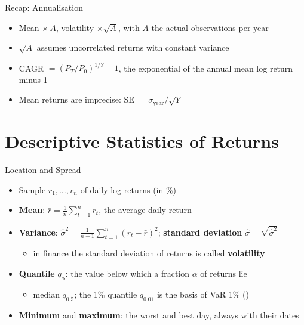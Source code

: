 \begin{frame}{Recap: Annualisation}
\itemsize{\small}
\begin{itemize}
    \item Mean $\times\, A$, volatility $\times \sqrt{A}$, with $A$ the actual observations per year
    \item $\sqrt{A}$ assumes uncorrelated returns with constant variance
    \item CAGR $= (P_T/P_0)^{1/Y} - 1$, the exponential of the annual mean log return minus 1
    \item Mean returns are imprecise: SE $= \sigma_{\text{year}}/\sqrt{Y}$
\end{itemize}
\end{frame}


\section{Descriptive Statistics of Returns}

\begin{frame}{Location and Spread}
\itemsize{\small}
\begin{itemize}
    \item Sample $r_1, \dots, r_n$ of daily log returns (in \%)
    \item \textbf{Mean}: $\bar r = \frac1n \sum_{t=1}^{n} r_t$, the average daily return
    \item \textbf{Variance}: $\hat\sigma^2 = \frac{1}{n-1} \sum_{t=1}^{n} (r_t - \bar r)^2$; \textbf{standard deviation} $\hat\sigma = \sqrt{\hat\sigma^2}$
    \begin{itemize}
        \item in finance the standard deviation of returns is called \textbf{volatility}
    \end{itemize}
    \item \textbf{Quantile} $q_\alpha$: the value below which a fraction $\alpha$ of returns lie
    \begin{itemize}
        \item median $q_{0.5}$; the 1\% quantile $q_{0.01}$ is the basis of VaR 1\% ()
    \end{itemize}
    \item \textbf{Minimum} and \textbf{maximum}: the worst and best day, always with their dates
\end{itemize}
\end{frame}

